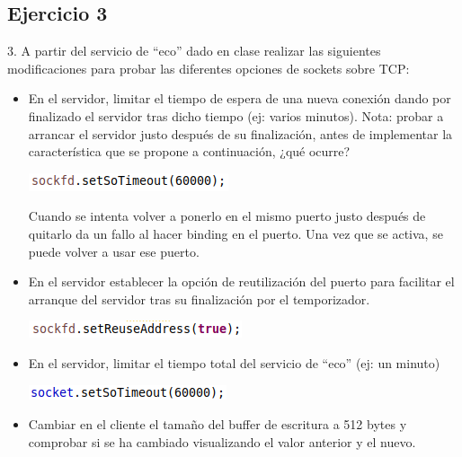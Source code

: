\documentclass{article}
\begin{document}
\subsection{Ejercicio 3}

3. A partir del servicio de “eco” dado en clase realizar las siguientes modificaciones para
probar las diferentes opciones de sockets sobre TCP:
\begin{itemize}
\item En el servidor, limitar el tiempo de espera de una nueva conexión dando por finalizado
el servidor tras dicho tiempo (ej: varios minutos). Nota: probar a arrancar el servidor
justo después de su finalización, antes de implementar la característica que se propone
a continuación, ¿qué ocurre?

\begin{center}
\includegraphics[scale=0.5]{images/serverTimeout.png}
\end{center}

Cuando se intenta volver a ponerlo en el mismo puerto justo después de quitarlo da un fallo al hacer binding en el puerto. Una vez que se activa, se puede volver a usar ese puerto.

\item En el servidor establecer la opción de reutilización del puerto para facilitar el arranque del servidor tras su finalización por el temporizador.

\begin{center}
\includegraphics[scale=0.5]{images/reuse.png}
\end{center}

\item En el servidor, limitar el tiempo total del servicio de “eco” (ej: un minuto)

\begin{center}
\includegraphics[scale=0.5]{images/timeout.png}
\end{center}

\item Cambiar en el cliente el tamaño del buffer de escritura a 512 bytes y comprobar si se
ha cambiado visualizando el valor anterior y el nuevo.


\end{itemize}
\end{document}
